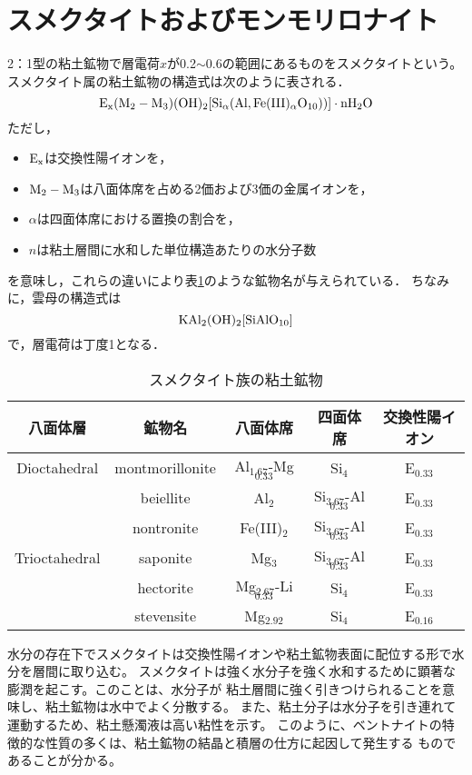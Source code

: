 \section{スメクタイトおよびモンモリロナイト}
2：1型の粘土鉱物で層電荷$x$が0.2$\sim$0.6の範囲にあるものをスメクタイトという。
スメクタイト属の粘土鉱物の構造式は次のように表される．
\[
	\rm 
	E_x(M_2-M_3)(OH)_2
	[ Si_\alpha (Al,Fe(III)_\alpha O_{10}))]
	\cdot nH_2O
\]
ただし，
\begin{itemize}
\item 
	$\rm E_x$は交換性陽イオンを，
\item
	$\rm M_2-M_3$は八面体席を占める2価および3価の金属イオンを，
\item
	$\alpha$は四面体席における置換の割合を，
\item
	$n$は粘土層間に水和した単位構造あたりの水分子数
\end{itemize}
を意味し，これらの違いにより表\ref{tbl:smectite}のような鉱物名が与えられている．
ちなみに，雲母の構造式は
\[
	\rm KAl_2(OH)_2[SiAlO_{10}]
\]
で，層電荷は丁度1となる．
\begin{table}[h]
\begin{center}
	\caption{スメクタイト族の粘土鉱物}
\begin{tabular}{c|c|c|c|c}
	\hline \hline 
	八面体層 & 鉱物名 & 八面体席 & 四面体席 & 交換性陽イオン \\
	\hline 
	Dioctahedral & montmorillonite & Al$_{1.67}$-Mg$_{0.33}$ & Si$_4$ & E$_{0.33}$ \\
		& beiellite & Al$_{2}$ & Si$_{3.67}$-Al$_{0.33}$ & E$_{0.33}$ \\
		& nontronite & Fe(III)$_{2}$ & Si$_{3.67}$-Al$_{0.33}$ & E$_{0.33}$ \\
	\hline
	Trioctahedral & saponite & Mg$_{3}$ & Si$_{3.67}$-Al$_{0.33}$ & E$_{0.33}$ \\
	 & hectorite & Mg$_{2.67}$-Li$_{0.33}$ & Si$_{4}$ & E$_{0.33}$ \\
	 & stevensite & Mg$_{2.92}$ & Si$_{4}$ & E$_{0.16}$ \\
\hline  \hline
\end{tabular}
	\label{tbl:smectite}
\end{center}
\end{table}
水分の存在下でスメクタイトは交換性陽イオンや粘土鉱物表面に配位する形で水分を層間に取り込む。
スメクタイトは強く水分子を強く水和するために顕著な膨潤を起こす。このことは、水分子が
粘土層間に強く引きつけられることを意味し、粘土鉱物は水中でよく分散する。
また、粘土分子は水分子を引き連れて運動するため、粘土懸濁液は高い粘性を示す。
このように、ベントナイトの特徴的な性質の多くは、粘土鉱物の結晶と積層の仕方に起因して発生する
ものであることが分かる。


